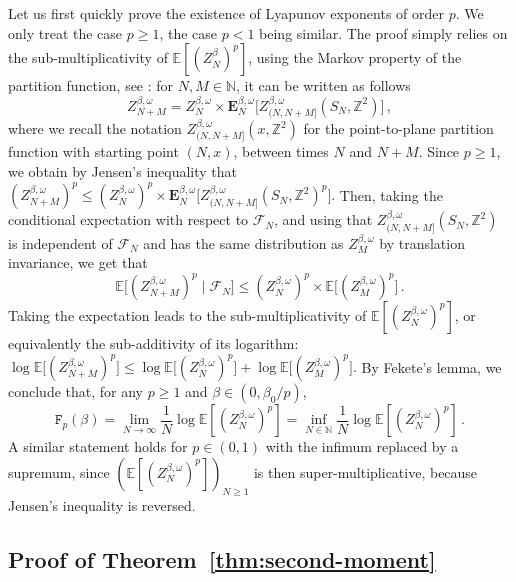 \documentclass[11pt]{amsart}
\numberwithin{equation}{section}
\newcommand*{\EE}{\mathbb{E}}
\newcommand*{\bE}{\mathbf{E}}
\newcommand*{\numberset}{\mathbb}
\newcommand*{\N}{\numberset{N}}
\newcommand*{\Z}{\numberset{Z}}
\newcommand*{\tF}{\mathtt{F}}
\theoremstyle{plain}
\theoremstyle{definition}
\theoremstyle{remark}
\begin{document}
Let us first quickly prove the existence of Lyapunov exponents of order \(p\).
We only treat the case \(p\geq 1\), the case \(p<1\) being similar.
The proof simply relies on the sub-multiplicativity of \(\EE[(Z_{N}^{\beta})^p]\), using the Markov property of the partition function, see \cite[Eq.~(2.3)]{Com17}:
for \(N,M\in \N\), it can be written as follows
\[
       Z_{N+M}^{\beta,\omega} =  Z_{N}^{\beta,\omega} \times \bE_N^{\beta,\omega}\big[ Z_{(N,N+M]}^{\beta,\omega}(S_N,\Z^2) \big]\,,
\]
where we recall the notation \(Z_{(N,N+M]}^{\beta,\omega}(x,\Z^2)\) for the point-to-plane partition function with starting point \((N,x)\), between times \(N\) and \(N+M\). 
Since \(p\geq 1\), we obtain by Jensen's inequality that 
\(
       (Z_{N+M}^{\beta,\omega})^p \leq  (Z_{N}^{\beta,\omega})^p \times \bE_N^{\beta,\omega}\big[ Z_{(N,N+M]}^{\beta,\omega}(S_N,\Z^2)^p \big] .
\)
Then, taking the conditional expectation with respect to \(\mathcal{F}_N\), and using that \(Z_{(N,N+M]}^{\beta,\omega}(S_N,\Z^2)\) is independent of \(\mathcal{F}_N\) and has the same distribution as \(Z_{M}^{\beta,\omega}\) by translation invariance, we get that 
\[
\EE\big[(Z_{N+M}^{\beta,\omega})^p \mid \mathcal{F}_N \big] \leq  (Z_{N}^{\beta,\omega})^p \times \EE\big[ (Z_{M}^{\beta,\omega})^p \big] \,.
\]
Taking the expectation leads to the sub-multiplicativity of \(\EE[(Z_{N}^{\beta,\omega})^p]\), or equivalently the sub-additivity of its logarithm:
\(
       \log \EE\big[(Z_{N+M}^{\beta,\omega})^p \big] \leq \log \EE\big[(Z_{N}^{\beta,\omega})^p \big] + \log \EE\big[(Z_{M}^{\beta,\omega})^p \big]  .
\)
By Fekete's lemma, we conclude that, for any \(p\geq 1\) and $\beta \in (0,\beta_0/p)$,
\begin{equation}
       \label{eq:lyapunov-inf}
       \tF_p(\beta) = \lim_{N\to\infty} \frac1N \log \EE[(Z_{N}^{\beta,\omega})^p] = \inf_{N\in \N} \frac1N \log \EE[(Z_{N}^{\beta,\omega})^p]\,.
\end{equation}
A similar statement holds for \(p\in (0,1)\) with the infimum replaced by a supremum, since \((\EE[(Z_{N}^{\beta,\omega})^p])_{N\geq 1}\) is then super-multiplicative, because Jensen's inequality is reversed. 




\subsection{Proof of Theorem~\ref{thm:second-moment}}
\end{document}
